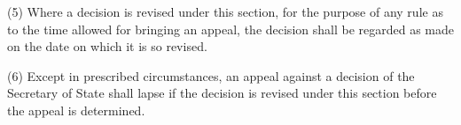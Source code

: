 \documentclass[12pt,a4paper]{article}
\begin{document}
(5) Where a decision is revised under this section, for the purpose of any rule as to the time allowed for bringing an appeal, the decision shall be regarded as made on the date on which it is so revised.

(6) Except in prescribed circumstances, an appeal against a decision of the Secretary of State shall lapse if the decision is revised under this section before the appeal is determined.

\end{document}

